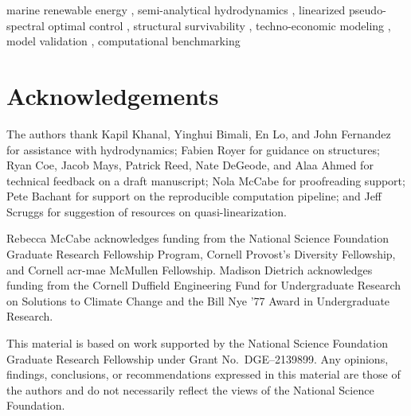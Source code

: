\documentclass[a4paper,fleqn,colorlinks,unicode,hypertexnames=false]{cas-dc}
\begin{document}
\begin{highlights}

\end{highlights}

\begin{keywords}
marine renewable energy \sep
semi-analytical hydrodynamics \sep
linearized pseudo-spectral optimal control \sep
structural survivability \sep
techno-economic modeling \sep
model validation \sep
computational benchmarking
\end{keywords}

\maketitle




\section*{Acknowledgements}

The authors thank Kapil Khanal, Yinghui Bimali, En Lo, and John Fernandez for assistance with hydrodynamics;
Fabien Royer for guidance on structures;
Ryan Coe, Jacob Mays, Patrick Reed, Nate DeGeode, and Alaa Ahmed for technical feedback on a draft manuscript;
Nola McCabe for proofreading support;
Pete Bachant for support on the reproducible computation pipeline;
and Jeff Scruggs for suggestion of resources on quasi-linearization.

Rebecca McCabe acknowledges funding from the National Science Foundation Graduate Research Fellowship Program, Cornell Provost's Diversity Fellowship, and Cornell \gls{acr-mae} McMullen Fellowship.
Madison Dietrich acknowledges funding from the Cornell Duffield Engineering Fund for Undergraduate Research on Solutions to Climate Change and the Bill Nye '77 Award in Undergraduate Research.

This material is based on work supported by the National Science Foundation Graduate Research Fellowship under Grant No.~DGE--2139899.
Any opinions, findings, conclusions, or recommendations expressed in this material are those of the authors and do not necessarily reflect the views of the National Science Foundation.
\end{document}

